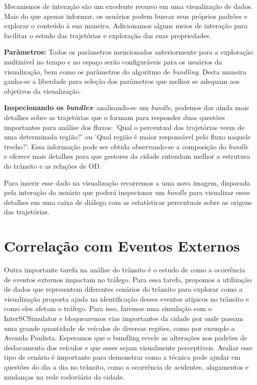 Mecanismos de interação são um excelente recurso em uma visualização de dados.
Mais do que apenas informar, os usuários podem buscar seus próprios padrões e
explorar o conteúdo à sua maneira. Adicionamos alguns meios de interação para
facilitar o estudo das trajetórias e exploração das suas propriedades.
 
\textbf{Parâmetros:} Todos os parâmetros mencionados anteriormente para a exploração
multinível no tempo e no espaço serão configuráveis para os usuários da visualização,
bem como os parâmetros do algoritmo de \emph{bundling}. Desta maneira ganha-se
a liberdade para seleção dos parâmetros que melhor se adequam aos objetivos
da visualização.

\textbf{Inspecionando os \emph{bundles}}: analisando-se um \emph{bundle},
podemos dar ainda mais detalhes sobre as trajetórias que o formam para
responder duas questões importantes para análise dos fluxos: 'Qual o percentual
das trajetórias veem de uma determinada região?' ou 'Qual região é maior
responsável pelo fluxo naquele trecho?'.  Essa informação pode ser obtida
observando-se a composição do \emph{bundle} e oferece mais detalhes para que
gestores da cidade entendam melhor a estrutura do trânsito e as relações de OD.

 Para inserir esse dado na visualização recorremos a uma nova
imagem, disparada pela interação do usuário que poderá inspecionar um
\emph{bundle} para visualizar esses detalhes em uma caixa de diálogo com as
estatísticas percentuais sobre as origens das trajetórias.

\section{Correlação com Eventos Externos}

  Outra importante tarefa na análise do trânsito é o estudo de como a
ocorrência de eventos externos impactam no tráfego. Para essa tarefa, propomos
a utilização de dados que representem diferentes cenários do trânsito para
explorar como a visualização proposta ajuda na identificação desses eventos
atípicos no trânsito e como eles afetam o tráfego. Para isso, faremos uma
simulação com o InterSCSimulator e bloquearemos vias importantes da cidade por
onde passam uma grande quantidade de veículos de diversas regiões, como por
exemplo a Avenida Paulista. Esperamos que o bundling revele as alterações nos
padrões de deslocamento dos veículos e que esses sejam visualmente
perceptíveis. Avaliar esse tipo de cenário é importante para demonstrar como a
técnica pode ajudar em questões do dia a dia no trânsito, como a ocorrência de
acidentes, alagamentos e mudanças na rede rodoviária da cidade.

